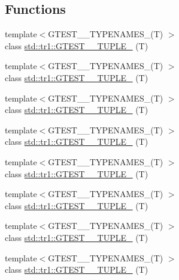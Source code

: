 \subsection*{Functions}
\begin{DoxyCompactItemize}
\item 
{\footnotesize template$<$G\-T\-E\-S\-T\-\_\-\_\-\-T\-Y\-P\-E\-N\-A\-M\-E\-S\-\_\-(\-T) $>$ }\\class \hyperlink{namespacestd_1_1tr1_a9971f52f994f142fe36c786b991cfd3e}{std\-::tr1\-::\-G\-T\-E\-S\-T\-\_\-\_\-\-T\-U\-P\-L\-E\-\_\-} (T)
\item 
{\footnotesize template$<$G\-T\-E\-S\-T\-\_\-\_\-\-T\-Y\-P\-E\-N\-A\-M\-E\-S\-\_\-(\-T) $>$ }\\class \hyperlink{namespacestd_1_1tr1_a05651180c3a4c06fe0f3b09144b82b93}{std\-::tr1\-::\-G\-T\-E\-S\-T\-\_\-\_\-\-T\-U\-P\-L\-E\-\_\-} (T)
\item 
{\footnotesize template$<$G\-T\-E\-S\-T\-\_\-\_\-\-T\-Y\-P\-E\-N\-A\-M\-E\-S\-\_\-(\-T) $>$ }\\class \hyperlink{namespacestd_1_1tr1_a368170c49cc7d7f130c0564bbad01205}{std\-::tr1\-::\-G\-T\-E\-S\-T\-\_\-\_\-\-T\-U\-P\-L\-E\-\_\-} (T)
\item 
{\footnotesize template$<$G\-T\-E\-S\-T\-\_\-\_\-\-T\-Y\-P\-E\-N\-A\-M\-E\-S\-\_\-(\-T) $>$ }\\class \hyperlink{namespacestd_1_1tr1_a661b17d2b7137863f06a016762f5c888}{std\-::tr1\-::\-G\-T\-E\-S\-T\-\_\-\_\-\-T\-U\-P\-L\-E\-\_\-} (T)
\item 
{\footnotesize template$<$G\-T\-E\-S\-T\-\_\-\_\-\-T\-Y\-P\-E\-N\-A\-M\-E\-S\-\_\-(\-T) $>$ }\\class \hyperlink{namespacestd_1_1tr1_a51b070e2eb5e6bb83a290f35c19667dd}{std\-::tr1\-::\-G\-T\-E\-S\-T\-\_\-\_\-\-T\-U\-P\-L\-E\-\_\-} (T)
\item 
{\footnotesize template$<$G\-T\-E\-S\-T\-\_\-\_\-\-T\-Y\-P\-E\-N\-A\-M\-E\-S\-\_\-(\-T) $>$ }\\class \hyperlink{namespacestd_1_1tr1_a485b05fdbbcfcf7ad5e4234e17702268}{std\-::tr1\-::\-G\-T\-E\-S\-T\-\_\-\_\-\-T\-U\-P\-L\-E\-\_\-} (T)
\item 
{\footnotesize template$<$G\-T\-E\-S\-T\-\_\-\_\-\-T\-Y\-P\-E\-N\-A\-M\-E\-S\-\_\-(\-T) $>$ }\\class \hyperlink{namespacestd_1_1tr1_ab451b390a95ee0555d7a43b67ea348aa}{std\-::tr1\-::\-G\-T\-E\-S\-T\-\_\-\_\-\-T\-U\-P\-L\-E\-\_\-} (T)
\item 
{\footnotesize template$<$G\-T\-E\-S\-T\-\_\-\_\-\-T\-Y\-P\-E\-N\-A\-M\-E\-S\-\_\-(\-T) $>$ }\\class \hyperlink{namespacestd_1_1tr1_ab2b1c72e9db7436909d9ac011645f29d}{std\-::tr1\-::\-G\-T\-E\-S\-T\-\_\-\_\-\-T\-U\-P\-L\-E\-\_\-} (T)

\end{DoxyCompactItemize}

